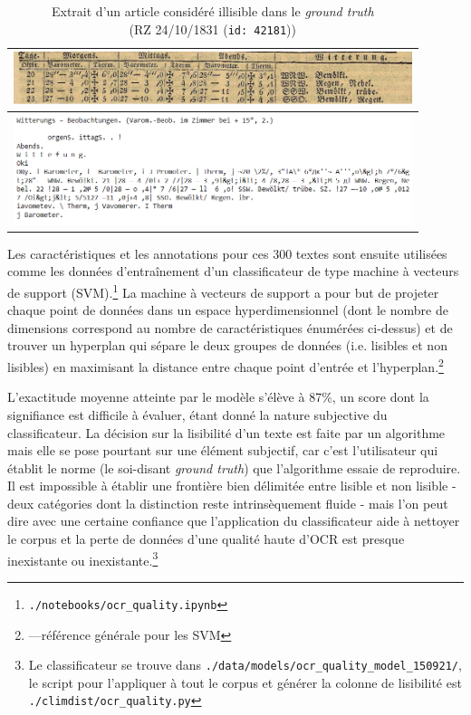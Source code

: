 \documentclass[a4paper,twoside,12pt]{article}
\begin{document}
\begin{table}[h]
\centering
\begin{tabular}{|p{0.9\linewidth}|}
\hline
\vspace{0.5ex}
\includegraphics[width={\linewidth}]{images/ocr_quality_example.png} \\
\hline
\includegraphics[width={\linewidth}]{images/ocr_quality_example_text.png} \\
\hline
\end{tabular}
\captionsetup{justification=centering}
\caption{Extrait d'un article considéré illisible dans le \textit{ground truth}\\ (RZ 24/10/1831 (\texttt{id: 42181}))}
\label{tab:readability_example}
\end{table}

Les caractéristiques et les annotations pour ces 300 textes sont ensuite utilisées comme les données d'entraînement d'un classificateur de type machine à vecteurs de support (SVM).\footnote{\texttt{./notebooks/ocr\_quality.ipynb}} La machine à vecteurs de support a pour but de projeter chaque point de données dans un espace hyperdimensionnel (dont le nombre de dimensions correspond au nombre de caractéristiques énumérées ci-dessus) et de trouver un hyperplan qui sépare le deux groupes de données (i.e. lisibles et non lisibles) en maximisant la distance entre chaque point d'entrée et l'hyperplan.\footnote{---référence générale pour les SVM}

L'exactitude moyenne atteinte par le modèle s'élève à 87\%, un score dont la signifiance est difficile à évaluer, étant donné la nature subjective du classificateur. La décision sur la lisibilité d'un texte est faite par un algorithme mais elle se pose pourtant sur une élément subjectif, car c'est l'utilisateur qui établit le norme (le soi-disant \textit{ground truth}) que l'algorithme essaie de reproduire.
Il est impossible à établir une frontière bien délimitée entre lisible et non lisible - deux catégories dont la distinction reste intrinsèquement fluide - mais l'on peut dire avec une certaine confiance que l'application du classificateur aide à nettoyer le corpus et la perte de données d'une qualité haute d'OCR est presque inexistante ou inexistante.\footnote{Le classificateur se trouve dans \texttt{./data/models/ocr\_quality\_model\_150921/}, le script pour l'appliquer à tout le corpus et générer la colonne de lisibilité est \texttt{./climdist/ocr\_quality.py}}
\end{document}
